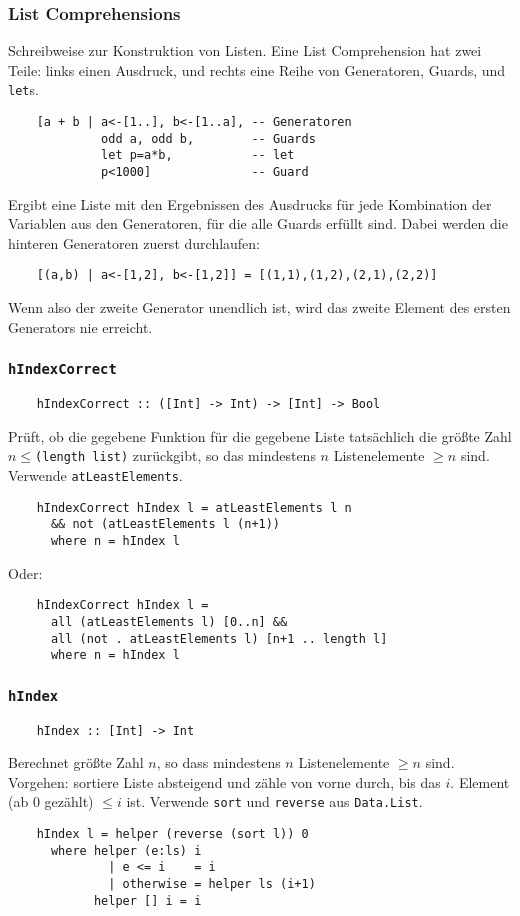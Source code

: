 \documentclass{beamer}
\begin{document}
\begin{frame}[fragile]
  \frametitle{List Comprehensions}
  Schreibweise zur Konstruktion von Listen.
  Eine List Comprehension hat zwei Teile:
  links einen Ausdruck,
  und rechts eine Reihe von Generatoren, Guards, und \texttt{let}s.
  \begin{lstlisting}
    [a + b | a<-[1..], b<-[1..a], -- Generatoren
             odd a, odd b,        -- Guards
             let p=a*b,           -- let
             p<1000]              -- Guard
  \end{lstlisting}
  Ergibt eine Liste mit den Ergebnissen des Ausdrucks für jede Kombination der Variablen aus den Generatoren, für die alle Guards erfüllt sind.
  Dabei werden die hinteren Generatoren zuerst durchlaufen:
  \begin{lstlisting}
    [(a,b) | a<-[1,2], b<-[1,2]] = [(1,1),(1,2),(2,1),(2,2)]
  \end{lstlisting}
  Wenn also der zweite Generator unendlich ist, wird das zweite Element des ersten Generators nie erreicht.
\end{frame}

\begin{frame}[fragile]
  \frametitle{\lstinline{hIndexCorrect}}
  \begin{lstlisting}
    hIndexCorrect :: ([Int] -> Int) -> [Int] -> Bool
  \end{lstlisting}
  Prüft, ob die gegebene Funktion für die gegebene Liste tatsächlich die größte Zahl $n \leq $\lstinline{(length list)} zurückgibt,
  so das mindestens $n$ Listenelemente $\geq n$ sind.
  Verwende \lstinline{atLeastElements}.
  \pause
  \begin{lstlisting}
    hIndexCorrect hIndex l = atLeastElements l n
      && not (atLeastElements l (n+1))
      where n = hIndex l
  \end{lstlisting}
  Oder:
  \begin{lstlisting}
    hIndexCorrect hIndex l =
      all (atLeastElements l) [0..n] &&
      all (not . atLeastElements l) [n+1 .. length l]
      where n = hIndex l
  \end{lstlisting}
\end{frame}

\begin{frame}[fragile]
  \frametitle{\lstinline{hIndex}}
  \begin{lstlisting}
    hIndex :: [Int] -> Int
  \end{lstlisting}
  Berechnet größte Zahl $n$, so dass mindestens $n$ Listenelemente $\geq n$ sind.
  Vorgehen: sortiere Liste absteigend und zähle von vorne durch, bis das $i$. Element (ab 0 gezählt) $\leq i$ ist.
  Verwende \lstinline{sort} und \lstinline{reverse} aus \lstinline{Data.List}.
  \pause
  \begin{lstlisting}
    hIndex l = helper (reverse (sort l)) 0
      where helper (e:ls) i
              | e <= i    = i
              | otherwise = helper ls (i+1)
            helper [] i = i
  \end{lstlisting}
\end{frame}
\end{document}
